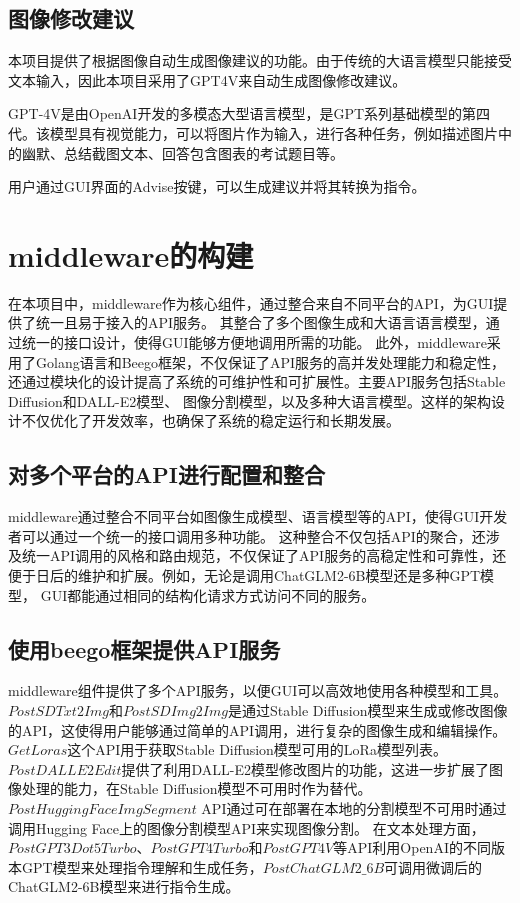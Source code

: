 \documentclass[a4paper,AutoFakeBold,oneside,12pt]{book}
\begin{document}
\section{图像修改建议}
本项目提供了根据图像自动生成图像建议的功能。由于传统的大语言模型只能接受文本输入，因此本项目采用了GPT4V来自动生成图像修改建议。

GPT-4V是由OpenAI开发的多模态大型语言模型，是GPT系列基础模型的第四代。该模型具有视觉能力，可以将图片作为输入，进行各种任务，例如描述图片中的幽默、总结截图文本、回答包含图表的考试题目等。

用户通过GUI界面的Advise按键，可以生成建议并将其转换为指令。

\chapter{middleware的构建} %
在本项目中，middleware作为核心组件，通过整合来自不同平台的API，为GUI提供了统一且易于接入的API服务。
其整合了多个图像生成和大语言语言模型，通过统一的接口设计，使得GUI能够方便地调用所需的功能。
此外，middleware采用了Golang语言和Beego框架，不仅保证了API服务的高并发处理能力和稳定性，
还通过模块化的设计提高了系统的可维护性和可扩展性。主要API服务包括Stable Diffusion和DALL-E2模型、
图像分割模型，以及多种大语言模型。这样的架构设计不仅优化了开发效率，也确保了系统的稳定运行和长期发展。
\section{对多个平台的API进行配置和整合}
middleware通过整合不同平台如图像生成模型、语言模型等的API，使得GUI开发者可以通过一个统一的接口调用多种功能。
这种整合不仅包括API的聚合，还涉及统一API调用的风格和路由规范，不仅保证了API服务的高稳定性和可靠性，还便于日后的维护和扩展。例如，无论是调用ChatGLM2-6B模型还是多种GPT模型，
GUI都能通过相同的结构化请求方式访问不同的服务。


\section{使用beego框架提供API服务}
middleware组件提供了多个API服务，以便GUI可以高效地使用各种模型和工具。
$PostSDTxt2Img$和$PostSDImg2Img$是通过Stable Diffusion模型来生成或修改图像的API，这使得用户能够通过简单的API调用，进行复杂的图像生成和编辑操作。$GetLoras$这个API用于获取Stable Diffusion模型可用的LoRa模型列表。
$PostDALLE2Edit$提供了利用DALL-E2模型修改图片的功能，这进一步扩展了图像处理的能力，在Stable Diffusion模型不可用时作为替代。
$PostHuggingFaceImgSegment$ API通过可在部署在本地的分割模型不可用时通过调用Hugging Face上的图像分割模型API来实现图像分割。
在文本处理方面，$PostGPT3Dot5Turbo$、$PostGPT4Turbo$和$PostGPT4V$等API利用OpenAI的不同版本GPT模型来处理指令理解和生成任务，$PostChatGLM2\_6B$可调用微调后的ChatGLM2-6B模型来进行指令生成。
\end{document}
